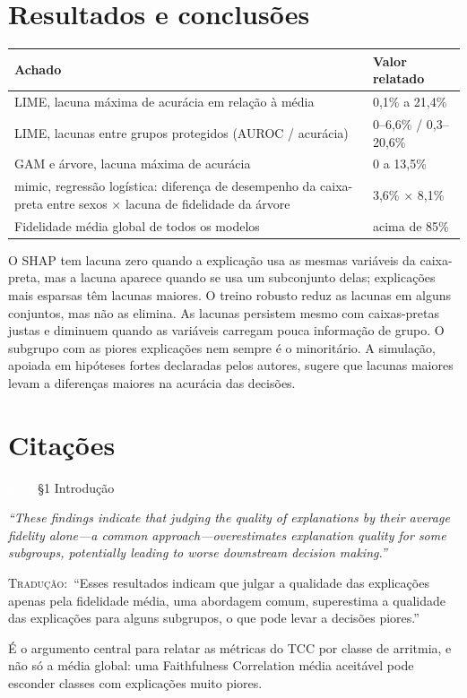 \documentclass[11pt,a4paper]{article}
\newcommand{\pagechip}[1]{{\setlength{\fboxsep}{1.5pt}\colorbox{cAcc}{\textcolor{white}{\scriptsize\texttt{#1}}}}}
\newenvironment{origquote}{\par\itshape\small}{\par}
\newenvironment{tradquote}{\par\small\textsc{Tradução:}\ }{\par}
\newcommand{\explab}[1]{\par\smallskip{\small\color{cAcc}\textbf{\MakeUppercase{#1}}}\par}
\begin{document}
\section{Resultados e conclusões}
\begin{center}
\small
\begin{tabularx}{\linewidth}{Xl}
\toprule
Achado & Valor relatado \\
\midrule
LIME, lacuna máxima de acurácia em relação à média & 0,1\% a 21,4\% \\
LIME, lacunas entre grupos protegidos (AUROC / acurácia) & 0--6,6\% / 0,3--20,6\% \\
GAM e árvore, lacuna máxima de acurácia & 0 a 13,5\% \\
mimic, regressão logística: diferença de desempenho da caixa-preta entre sexos $\times$ lacuna de fidelidade da árvore & 3,6\% $\times$ 8,1\% \\
Fidelidade média global de todos os modelos & acima de 85\% \\
\bottomrule
\end{tabularx}
\end{center}
O SHAP tem lacuna zero quando a explicação usa as mesmas variáveis da caixa-preta, mas a lacuna aparece quando se usa um subconjunto delas; explicações mais esparsas têm lacunas maiores. O treino robusto reduz as lacunas em alguns conjuntos, mas não as elimina. As lacunas persistem mesmo com caixas-pretas justas e diminuem quando as variáveis carregam pouca informação de grupo. O subgrupo com as piores explicações nem sempre é o minoritário. A simulação, apoiada em hipóteses fortes declaradas pelos autores, sugere que lacunas maiores levam a diferenças maiores na acurácia das decisões.

\section{Citações}

\begin{citacard}{\pagechip{p. 2} §1 Introdução}
\begin{origquote}“These findings indicate that judging the quality of explanations by their average fidelity alone—a common approach—overestimates explanation quality for some subgroups, potentially leading to worse downstream decision making.”\end{origquote}
\begin{tradquote}“Esses resultados indicam que julgar a qualidade das explicações apenas pela fidelidade média, uma abordagem comum, superestima a qualidade das explicações para alguns subgrupos, o que pode levar a decisões piores.”\end{tradquote}
\explab{Explicação}
É o argumento central para relatar as métricas do TCC por classe de arritmia, e não só a média global: uma Faithfulness Correlation média aceitável pode esconder classes com explicações muito piores.
\end{citacard}
\end{document}
